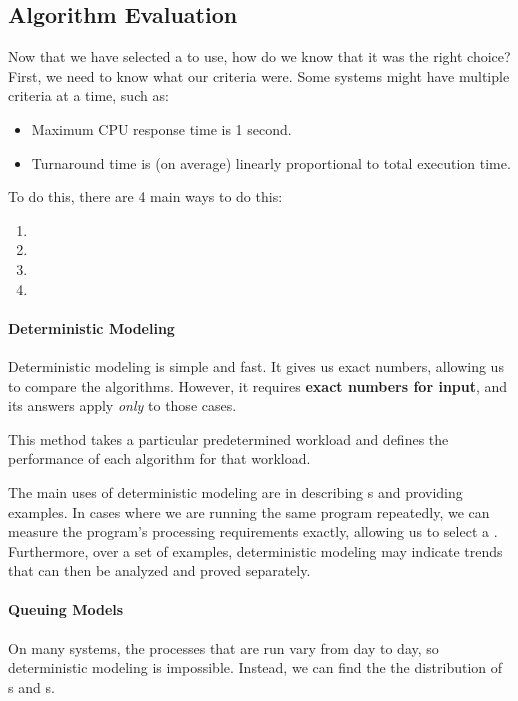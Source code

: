 \subsection{Algorithm Evaluation}\label{subsec:Algorithm_Evaluation}
Now that we have selected a  to use, how do we know that it was the right choice?
First, we need to know what our criteria were.
Some systems might have multiple criteria at a time, such as:
\begin{itemize}[noitemsep]
\item Maximum CPU response time is 1 second.
\item Turnaround time is (on average) linearly proportional to total execution time.
\end{itemize}

To do this, there are 4 main ways to do this:
\begin{enumerate}[noitemsep]
\item {}
\item {}
\item {}
\item {}
\end{enumerate}

\paragraph{Deterministic Modeling}\label{par:Deterministic_Modeling}
Deterministic modeling is simple and fast.
It gives us exact numbers, allowing us to compare the algorithms.
However, it requires \textbf{exact numbers for input}, and its answers apply \emph{only} to those cases.

This method takes a particular predetermined workload and defines the performance of each algorithm for that workload.

The main uses of deterministic modeling are in describing s and providing examples.
In cases where we are running the same program repeatedly, we can measure the program’s processing requirements exactly, allowing us to select a .
Furthermore, over a set of examples, deterministic modeling may indicate trends that can then be analyzed and proved separately.

\paragraph{Queuing Models}\label{par:Queuing_Models}
On many systems, the processes that are run vary from day to day, so deterministic modeling is impossible.
Instead, we can find the the distribution of s and s.

